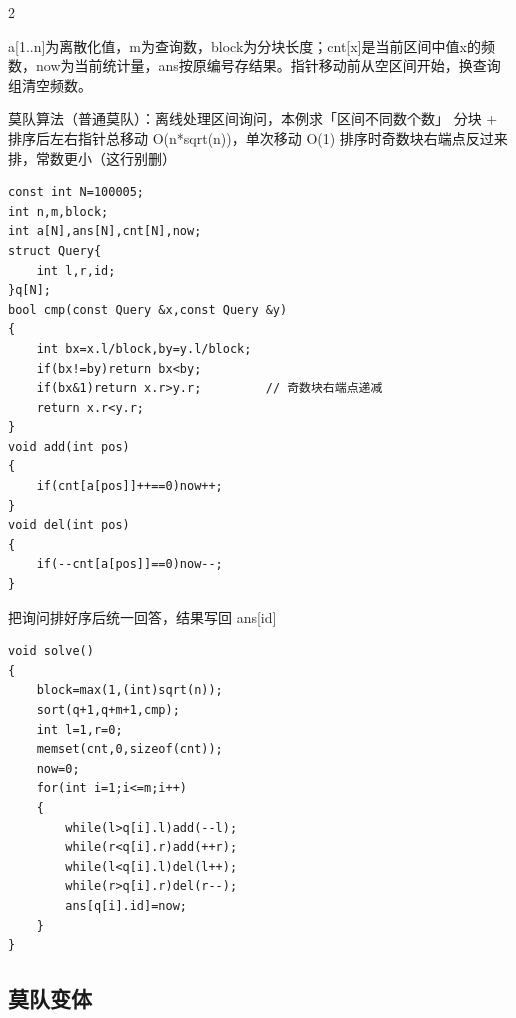 \documentclass[UTF8,fontset=fandol,a4paper,twoside]{ctexart}
\newcommand{\note}[1]{{\fontsize{10}{12}\selectfont #1\par}}
\begin{document}
\begin{multicols}{2}
\note{a[\allowbreak{}1.\allowbreak{}.\allowbreak{}n]\allowbreak{}为离散化值，m为查询数，block为分块长度；cnt[\allowbreak{}x]\allowbreak{}是当前区间中值x的频数，now为当前统计量，ans按原编号存结果。指针移动前从空区间开始，换查询组清空频数。}
\note{莫队算法（普通莫队）：离线处理区间询问，本例求「区间不同数个数」 分块 +\allowbreak{} 排序后左右指针总移动 O(\allowbreak{}n*sqrt(\allowbreak{}n)\allowbreak{})\allowbreak{}，单次移动 O(\allowbreak{}1)\allowbreak{} 排序时奇数块右端点反过来排，常数更小（这行别删）}
\begin{lstlisting}
const int N=100005;
int n,m,block;
int a[N],ans[N],cnt[N],now;
struct Query{
    int l,r,id;
}q[N];
bool cmp(const Query &x,const Query &y)
{
    int bx=x.l/block,by=y.l/block;
    if(bx!=by)return bx<by;
    if(bx&1)return x.r>y.r;         // 奇数块右端点递减
    return x.r<y.r;
}
void add(int pos)
{
    if(cnt[a[pos]]++==0)now++;
}
void del(int pos)
{
    if(--cnt[a[pos]]==0)now--;
}
\end{lstlisting}
\note{把询问排好序后统一回答，结果写回 ans[\allowbreak{}id]\allowbreak{}}
\begin{lstlisting}
void solve()
{
    block=max(1,(int)sqrt(n));
    sort(q+1,q+m+1,cmp);
    int l=1,r=0;
    memset(cnt,0,sizeof(cnt));
    now=0;
    for(int i=1;i<=m;i++)
    {
        while(l>q[i].l)add(--l);
        while(r<q[i].r)add(++r);
        while(l<q[i].l)del(l++);
        while(r>q[i].r)del(r--);
        ans[q[i].id]=now;
    }
}
\end{lstlisting}
\subsection{莫队变体}


\end{multicols}
\end{document}
